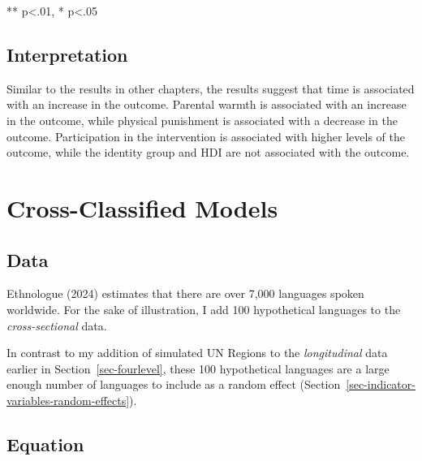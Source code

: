 \documentclass[
  letterpaper,
  DIV=11,
  numbers=noendperiod]{scrreprt}
\begin{document}
** p\textless.01, * p\textless.05

\subsection{Interpretation}\label{interpretation}

Similar to the results in other chapters, the results suggest that time
is associated with an increase in the outcome. Parental warmth is
associated with an increase in the outcome, while physical punishment is
associated with a decrease in the outcome. Participation in the
intervention is associated with higher levels of the outcome, while the
identity group and HDI are not associated with the outcome.

\section{Cross-Classified Models}\label{cross-classified-models}

\subsection{Data}\label{data-1}

Ethnologue (2024) estimates that there are over 7,000 languages spoken
worldwide. For the sake of illustration, I add 100 hypothetical
languages to the \emph{cross-sectional} data.

\begin{tcolorbox}[enhanced jigsaw, opacityback=0, coltitle=black, rightrule=.15mm, toprule=.15mm, bottomtitle=1mm, bottomrule=.15mm, breakable, colframe=quarto-callout-tip-color-frame, titlerule=0mm, opacitybacktitle=0.6, leftrule=.75mm, left=2mm, colback=white, toptitle=1mm, colbacktitle=quarto-callout-tip-color!10!white, title=\textcolor{quarto-callout-tip-color}{\faLightbulb}\hspace{0.5em}{Tip}, arc=.35mm]

In contrast to my addition of simulated UN Regions to the
\emph{longitudinal} data earlier in Section~\ref{sec-fourlevel}, these
100 hypothetical languages are a large enough number of languages to
include as a random effect
(Section~\ref{sec-indicator-variables-random-effects}).

\end{tcolorbox}

\subsection{Equation}\label{equation-1}
\end{document}
